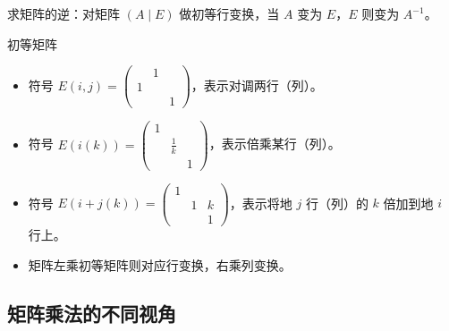 求矩阵的逆：对矩阵 $(A \mid E)$ 做初等行变换，当 $A$ 变为 $E$，$E$ 则变为 $A^{-1}$。

初等矩阵
\begin{itemize}
	\item 符号 $E(i,j) = \begin{pmatrix}
			       & 1 & \\ 1 &  & \\ & & 1
		      \end{pmatrix}$，表示对调两行（列）。
	\item 符号 $E(i(k)) = \begin{pmatrix}
			      1 &  & \\  & \frac{1}{k} & \\ & & 1
		      \end{pmatrix}$，表示倍乘某行（列）。
	\item 符号 $E(i+j(k)) = \begin{pmatrix}
			      1 &  & \\  &1 & k \\ & & 1
		      \end{pmatrix}$，表示将地 $j$ 行（列）的 $k$ 倍加到地 $i$ 行上。
	\item 矩阵左乘初等矩阵则对应行变换，右乘列变换。
\end{itemize}

\subsection{矩阵乘法的不同视角}

